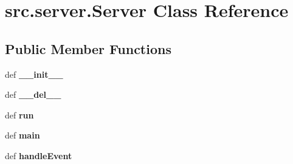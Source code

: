 \hypertarget{classsrc_1_1server_1_1_server}{\section{src.\-server.\-Server \-Class \-Reference}
\label{classsrc_1_1server_1_1_server}
}
\subsection*{\-Public \-Member \-Functions}
\begin{DoxyCompactItemize}
\item 
\hypertarget{classsrc_1_1server_1_1_server_ab52a728bb84ab6a81221c7449138e807}{def {\bfseries \-\_\-\-\_\-init\-\_\-\-\_\-}}\label{classsrc_1_1server_1_1_server_ab52a728bb84ab6a81221c7449138e807}

\item 
\hypertarget{classsrc_1_1server_1_1_server_a5b0212f18c14f58e2abb8c84a789bf2d}{def {\bfseries \-\_\-\-\_\-del\-\_\-\-\_\-}}\label{classsrc_1_1server_1_1_server_a5b0212f18c14f58e2abb8c84a789bf2d}

\item 
\hypertarget{classsrc_1_1server_1_1_server_a592d0980afabc0575c7e099629fdfb73}{def {\bfseries run}}\label{classsrc_1_1server_1_1_server_a592d0980afabc0575c7e099629fdfb73}

\item 
\hypertarget{classsrc_1_1server_1_1_server_aa9444ecc4c953cc71bd00aee7f7579a3}{def {\bfseries main}}\label{classsrc_1_1server_1_1_server_aa9444ecc4c953cc71bd00aee7f7579a3}

\item 
\hypertarget{classsrc_1_1server_1_1_server_a6b2455f4bf58450a16cdaa2dda1d1c25}{def {\bfseries handle\-Event}}\label{classsrc_1_1server_1_1_server_a6b2455f4bf58450a16cdaa2dda1d1c25}

\end{DoxyCompactItemize}
